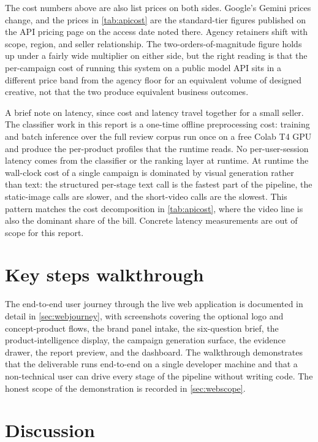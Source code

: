 \documentclass[12pt,a4paper]{report}
\begin{document}
The cost numbers above are also list prices on both sides. Google's Gemini prices change, and the prices in \cref{tab:apicost} are the standard-tier figures published on the API pricing page on the access date noted there. Agency retainers shift with scope, region, and seller relationship. The two-orders-of-magnitude figure holds up under a fairly wide multiplier on either side, but the right reading is that the per-campaign cost of running this system on a public model API sits in a different price band from the agency floor for an equivalent volume of designed creative, not that the two produce equivalent business outcomes.

A brief note on latency, since cost and latency travel together for a small seller. The classifier work in this report is a one-time offline preprocessing cost: training and batch inference over the full review corpus run once on a free Colab T4 GPU and produce the per-product profiles that the runtime reads. No per-user-session latency comes from the classifier or the ranking layer at runtime. At runtime the wall-clock cost of a single campaign is dominated by visual generation rather than text: the structured per-stage text call is the fastest part of the pipeline, the static-image calls are slower, and the short-video calls are the slowest. This pattern matches the cost decomposition in \cref{tab:apicost}, where the video line is also the dominant share of the bill. Concrete latency measurements are out of scope for this report.

\section{Key steps walkthrough}
\label{sec:walkthrough}

The end-to-end user journey through the live web application is documented in detail in \cref{sec:webjourney}, with screenshots covering the optional logo and concept-product flows, the brand panel intake, the six-question brief, the product-intelligence display, the campaign generation surface, the evidence drawer, the report preview, and the dashboard. The walkthrough demonstrates that the deliverable runs end-to-end on a single developer machine and that a non-technical user can drive every stage of the pipeline without writing code. The honest scope of the demonstration is recorded in \cref{sec:webscope}.

\section{Discussion}
\label{sec:discussion}
\end{document}
